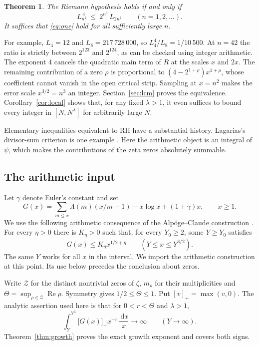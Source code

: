 \documentclass[11pt,a4paper]{article}
\newtheorem{theorem}{Theorem}
\newcommand{\Znt}{\mathcal Z}
\newcommand{\dd}{\,\mathrm d}
\newcommand{\Rea}{\operatorname{Re}}
\newcommand{\pos}[1]{\bigl[#1\bigr]_+}
\begin{document}
\begin{theorem}\label{thm:integer}
The Riemann hypothesis holds if and only if
\begin{equation}\label{eq:one}
 \boxed{\displaystyle L_{n^2}^{\,4}\ \le\ 2^{n^3}\,L_{2n^2}\qquad(n=1,2,\ldots).}
\end{equation}
It suffices that \eqref{eq:one} hold for all sufficiently large $n$.
\end{theorem}
For example, $L_4=12$ and $L_8=217\,728\,000$, so $L_4^4/L_8=1/10\,500$. At $n=42$ the ratio is strictly between $2^{123}$ and $2^{124}$, as can be checked using integer arithmetic. The exponent $4$ cancels the quadratic main term of $R$ at the scales $x$ and $2x$. The remaining contribution of a zero $\rho$ is proportional to $(4-2^{1+\rho})x^{1+\rho}$, whose coefficient cannot vanish in the open critical strip. Sampling at $x=n^2$ makes the error scale $x^{3/2}=n^3$ an integer. Section~\ref{sec:lcm} proves the equivalence. Corollary~\ref{cor:local} shows that, for any fixed $\lambda>1$, it even suffices to bound every integer in $[N,N^\lambda]$ for arbitrarily large $N$.

Elementary inequalities equivalent to RH have a substantial history. Lagarias's divisor-sum criterion is one example \cite{lagarias}. Here the arithmetic object is an integral of $\psi$, which makes the contributions of the zeta zeros absolutely summable.

\subsection*{The arithmetic input}
Let $\gamma$ denote Euler's constant and set
\begin{equation}\label{eq:G}
 G(x)=\sum_{m\le x}\Lambda(m)(x/m-1)-x\log x+(1+\gamma)x,\qquad x\ge1.
\end{equation}
We use the following arithmetic consequence of the Alp\"oge--Claude construction \cite{alp,rub}. For every $\eta>0$ there is $K_\eta>0$ such that, for every $Y_0\ge2$, some $Y\ge Y_0$ satisfies
\begin{equation}\tag{W}\label{eq:W}
  G(x)\le K_\eta x^{1/2+\eta}\qquad (Y\le x\le Y^{3/2}).
\end{equation}
The same $Y$ works for all $x$ in the interval. We import the arithmetic construction at this point. Its use below precedes the conclusion about zeros.

Write $\Znt$ for the distinct nontrivial zeros of $\zeta$, $m_\rho$ for their multiplicities and $\Theta=\sup_{\rho\in\Znt}\Rea\rho$. Symmetry gives $1/2\le\Theta\le1$. Put $[v]_+=\max(v,0)$. The analytic assertion used here is that for $0<r<\Theta$ and $\lambda>1$,
\begin{equation}\label{eq:div}
  \int_Y^{Y^\lambda}\pos{G(x)}x^{-r}\,\frac{\dd x}{x}\longrightarrow\infty
   \qquad(Y\to\infty).
\end{equation}
Theorem~\ref{thm:growth} proves the exact growth exponent and covers both signs.
\end{document}
